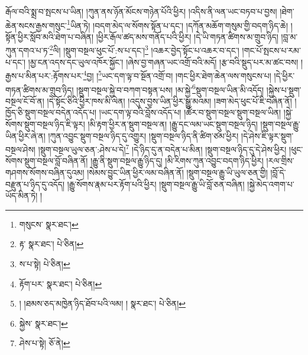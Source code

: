 རྒོལ་བའི་སྨྲ་བ་སྤངས་པ་ཡིན། །ཀུན་ནས་ཉོན་མོངས་གཉེན་པོའི་ཕྱིར། །འདིས་ནི་ལན་ཡང་བཏབ་པ་བྱས། །ཐེག་ཆེན་སངས་རྒྱས་གསུང་\footnote{གསུངས་  སྣར་ཐང་། }ཡིན་ཏེ། །བདག་མེད་ལ་སོགས་སྟོན་པ་དང་། །དཀོན་མཆོག་གསུམ་གྱི་བདག་ཉིད་ཆེ། །སྟོན་ཕྱིར་སློབ་མའི་ཐེག་པ་བཞིན། །ཕྱིར་རྒོལ་ཚད་མས་གནོད་པའི་ཕྱིར། །དེ་ཡི་གཏན་ཚིགས་མ་གྲུབ་ཉིད། །བླ་མ་ཀུན་དགའ་པ་ཏ་\footnote{རྟ་  སྣར་ཐང་།  པེ་ཅིན། }ལི། །སྡུག་བསྔལ་ཕུང་པོ་:ས་པ་དང་།\footnote{ས་པ་སྟེ།  པེ་ཅིན། } །འཆར་བྱེད་སྟོང་པ་འཆར་བ་དང་། །གང་པོ་སྤངས་པ་རམ་པ་དང་། །མྱ་ངན་འདས་དང་ཡུལ་འཁོར་སྐྱོང་། །ཞེས་བྱ་གཞན་ཡང་འགྲོ་བའི་མདོ། །རྩ་བའི་སྡུད་པར་མ་ཚང་བས། །རྒྱས་པ་མིན་པར་:རྟོགས་པར་\footnote{རྟོག་པར་  སྣར་ཐང་།  པེ་ཅིན། }བྱ། །\footnote{། །ཐམས་ཅད་མཁྱེན་ཉིད་ཐོབ་པའི་ལམ། །  སྣར་ཐང་།  པེ་ཅིན། }ཡང་དག་ལྟ་བ་སྔོན་འགྲོ་བ། །གང་ཕྱིར་ཐེག་ཆེན་ལས་གསུངས་པ། །དེ་ཕྱིར་གཏན་ཚིགས་མ་གྲུབ་ཉིད། །སྡུག་བསྔལ་སྐྱེ་བ་བཀག་བསྟན་པས། །མ་སྐྱེ་\footnote{སྐྱེས་  སྣར་ཐང་། }སྡུག་བསྔལ་ཡིན་མི་འདོད། །སྐྱེས་པ་སྡུག་བསྔལ་ངོ་བོ་ན། །དེ་སྟོང་ཅིའི་ཕྱིར་ཁས་མི་ལེན། །འདུས་བྱས་ཡིན་ཕྱིར་སྒྱུ་མའམ། །ཟག་མེད་ཕུང་པོ་ཇི་བཞིན་ནོ། །ཁྱོད་ཅི་སྡུག་བསྔལ་བདེན་འདོད་པ། །ཡང་དག་ལྟ་བའི་བློས་འདོད་པ། །ཚོར་བ་སྡུག་བསྔལ་སྡུག་བསྔལ་ཡིན། །སྐྱེ་སོགས་སྡུག་བསྔལ་ཉིད་ཇི་ལྟར། །མི་རྟག་ཕྱིར་ན་སྡུག་བསྔལ་ན། །རྒྱུ་དང་ལམ་ཡང་སྡུག་བསྔལ་ཉིད། །སྡུག་བསྔལ་རྒྱུ་ཡིན་ཕྱིར་ཞེ་ན། །ཀུན་འབྱུང་སྡུག་བསྔལ་ཉིད་དུ་འགྱུར། །སྡུག་བསྔལ་ཉིད་ནི་ཚིག་ཙམ་ཕྱིར། །དེ་ཤེས་ཇི་ལྟར་སྡུག་བསྔལ་ཤེས། །སྡུག་བསྔལ་ཡུལ་ཅན་:ཤེས་པ་དེ།\footnote{ཤེས་པ་སྟེ།  ཅོ་ནེ། } །དེ་ཉིད་དུ་ན་བདེན་པ་མིན། །སྡུག་བསྔལ་ཉིད་དུ་དེ་ཤེས་ཕྱིར། །ཕུང་སོགས་སྡུག་བསྔལ་བློ་བཞིན་ནོ། །རྒྱུ་ནི་སྡུག་བསྔལ་རྒྱུ་ཉིད་དུ། །མི་རིགས་ཀུན་འབྱུང་བདག་ཉིད་ཕྱིར། །རལ་གྲིས་གཤགས་སོགས་བཞིན་དུའམ། །སེམས་བྱུང་ཡིན་ཕྱིར་ལམ་བཞིན་ནོ། །སྡུག་བསྔལ་རྒྱུ་ཡི་ཡུལ་ཅན་གྱི། །བློ་དེ་བརྫུན་པ་ཉིད་དུ་འདོད། །རྒྱུ་སོགས་རྣམ་པར་རྟོག་པའི་ཕྱིར། །སྡུག་བསྔལ་རྒྱུ་ཡི་བློ་ཅན་བཞིན། །སྐྱེ་མེད་འགག་པ་ཡོད་མིན་ཏེ། །
